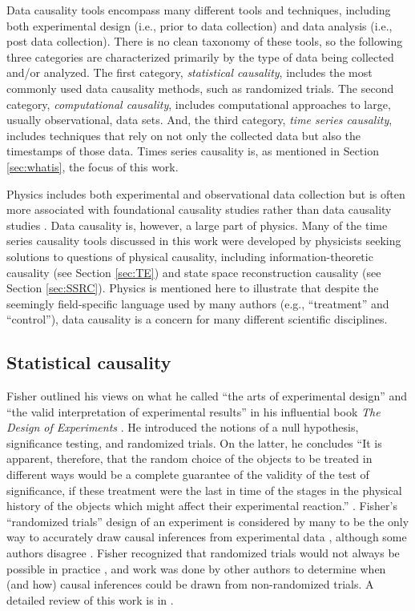 Data causality tools encompass many different tools and techniques, including both experimental design (i.e., prior to data collection) and data analysis (i.e., post data collection).  There is no clean taxonomy of these tools, so the following three categories are characterized primarily by the type of data being collected and/or analyzed.  The first category, {\em statistical causality}, includes the most commonly used data causality methods, such as randomized trials.  The second category, {\em computational causality}, includes computational approaches to large, usually observational, data sets.  And, the third category, {\em time series causality}, includes techniques that rely on not only the collected data but also the timestamps of those data.  Times series causality is, as mentioned in Section \ref{sec:whatis}, the focus of this work.

Physics includes both experimental and observational data collection but is often more associated with foundational causality studies rather than data causality studies \cite{Bunge1979,Bohm1971,Penrose1999}.  Data causality is, however, a large part of physics.  Many of the time series causality tools discussed in this work were developed by physicists seeking solutions to questions of physical causality, including information-theoretic causality (see Section \ref{sec:TE}) and state space reconstruction causality (see Section \ref{sec:SSRC}).  Physics is mentioned here to illustrate that despite the seemingly field-specific language used by many authors (e.g., ``treatment'' and ``control''), data causality is a concern for many different scientific disciplines.  

\subsection{Statistical causality} 
Fisher outlined his views on what he called ``the arts of experimental design'' and ``the valid interpretation of experimental results'' in his influential book {\em The Design of Experiments} \cite{Fisher1960}.  He introduced the notions of a null hypothesis, significance testing, and randomized trials.  On the latter, he concludes ``It is apparent, therefore, that the random choice of the objects to be treated in different ways would be a complete guarantee of the validity of the test of significance, if these treatment were the last in time of the stages in the physical history of the objects which might affect their experimental reaction.'' \cite{Fisher1960}.  Fisher's ``randomized trials'' design of an experiment is considered by many to be the only way to accurately draw causal inferences from experimental data \cite{Imbens2015,Morgan2014}, although some authors disagree \cite{Pearl2000}.  Fisher recognized that randomized trials would not always be possible in practice \cite{Fisher1960}, and work was done by other authors to determine when (and how) causal inferences could be drawn from non-randomized trials.  A detailed review of this work is in \cite{Morgan2014}.

